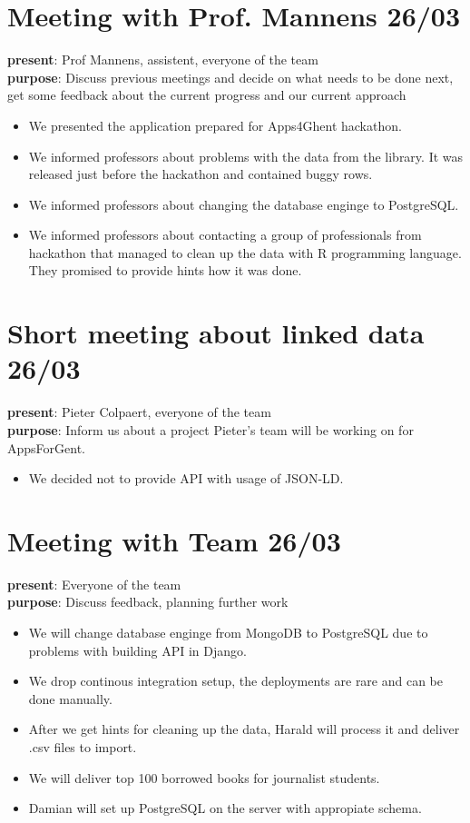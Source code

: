 \section{Meeting with Prof. Mannens 26/03}
{\bf present}: Prof Mannens, assistent, everyone of the team\\
{\bf purpose}: Discuss previous meetings and decide on what needs to be done next, get some feedback about the current progress and our current approach\\
\begin{itemize}
	\item We presented the application prepared for Apps4Ghent hackathon.
	\item We informed professors about problems with the data from the library. It was released just before the hackathon and contained buggy rows.
	\item We informed professors about changing the database enginge to PostgreSQL.
	\item We informed professors about contacting a group of professionals from hackathon that managed to clean up the data with R programming language. They promised to provide hints how it was done.
\end{itemize}

\section{Short meeting about linked data 26/03}
{\bf present}: Pieter Colpaert, everyone of the team\\
{\bf purpose}: Inform us about a project Pieter's team will be working on for AppsForGent.
\begin{itemize}
	\item We decided not to provide API with usage of JSON-LD.
\end{itemize}

\section{Meeting with Team 26/03}
{\bf present}: Everyone of the team\\
{\bf purpose}: Discuss feedback, planning further work\\
\begin{itemize}
	\item We will change database enginge from MongoDB to PostgreSQL due to problems with building API in Django.
	\item We drop continous integration setup, the deployments are rare and can be done manually.
	\item After we get hints for cleaning up the data, Harald will process it and deliver .csv files to import.
	\item We will deliver top 100 borrowed books for journalist students.
	\item Damian will set up PostgreSQL on the server with appropiate schema.
\end{itemize}

